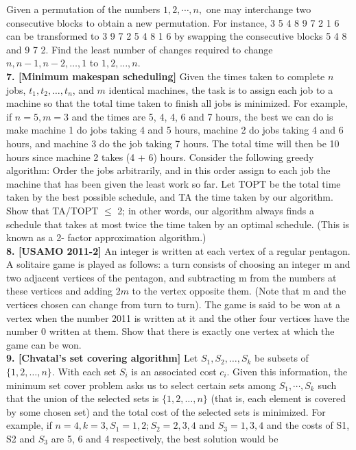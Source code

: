 \documentclass[a4paper,11pt]{book}
\begin{document}
Given a permutation of the numbers $1, 2,\cdots, n,$ one may
interchange two consecutive blocks to obtain a new
permutation. For instance, 3 5 4 8 9 7 2 1 6 can be
transformed to 3 9 7 2 5 4 8 1 6 by swapping the consecutive
blocks 5 4 8 and 9 7 2. Find the least number of changes
required to change $n, n-1, n-2, …, 1$ to $1, 2, …, n$.\\
\textbf{ 7. [Minimum makespan scheduling]}
Given the times taken to complete $n$ jobs, $t_1, t_2, …, t_n$, and $m$
identical machines, the task is to assign each job to a machine
so that the total time taken to finish all jobs is minimized. For
example, if $n = 5, m = 3$ and the times are 5, 4, 4, 6 and 7 hours,
the best we can do is make machine 1 do jobs taking 4 and 5
hours, machine 2 do jobs taking 4 and 6 hours, and machine 3
do the job taking 7 hours. The total time will then be 10 hours
since machine 2 takes (4 + 6) hours.
Consider the following greedy algorithm: Order the jobs
arbitrarily, and in this order assign to each job the machine
that has been given the least work so far. Let TOPT be the total
time taken by the best possible schedule, and TA the time
taken by our algorithm. Show that TA/TOPT $\le$ 2; in other words,
our algorithm always finds a schedule that takes at most twice
the time taken by an optimal schedule. (This is known as a 2-
factor approximation algorithm.)\\
\textbf{ 8. [USAMO 2011-2]}
An integer is written at each vertex of a regular pentagon. A
solitaire game is played as follows: a turn consists of choosing
an integer m and two adjacent vertices of the pentagon, and
subtracting m from the numbers at these vertices and adding
$2m$ to the vertex opposite them. (Note that m and the vertices
chosen can change from turn to turn). The game is said to be
won at a vertex when the number 2011 is written at it and the
other four vertices have the number 0 written at them. Show
that there is exactly one vertex at which the game can be won.\\
\textbf{9. [Chvatal’s set covering algorithm]}
Let $S_1, S_2, …, S_k$ be subsets of $\{1, 2, …, n\}$. With each set $S_i$ is an
associated cost $c_i$. Given this information, the minimum set
cover problem asks us to select certain sets among $S_1,\cdots, S_k$
such that the union of the selected sets is $\{1, 2, …, n\}$ (that is,
each element is covered by some chosen set) and the total cost
of the selected sets is minimized. For example, if $n = 4, k = 3, S_1
= {1, 2}; S_2 = {2, 3, 4}$ and $S_3 = {1, 3, 4}$ and the costs of S1, S2
and $S_3$ are 5, 6 and 4 respectively, the best solution would be
\end{document}
